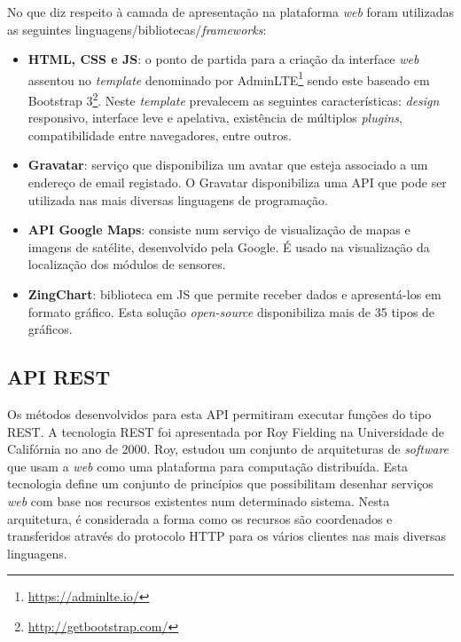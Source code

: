 No que diz respeito à camada de apresentação na plataforma \textit{web} foram utilizadas as seguintes linguagens/bibliotecas/\textit{frameworks}: 

\begin{itemize}
	\item \textbf{\acs{HTML}, \acs{CSS} e \acs{JS}}: o ponto de partida para a criação da interface \textit{web} assentou no \textit{template} denominado por AdminLTE\footnote{\url{https://adminlte.io/}} sendo este baseado em Bootstrap 3\footnote{\url{http://getbootstrap.com/}}. Neste \textit{template} prevalecem as seguintes características:  \textit{design} responsivo, interface leve e apelativa, existência de múltiplos \textit{plugins}, compatibilidade entre navegadores, entre outros. 
	
	\item \textbf{Gravatar}: serviço que disponibiliza um avatar que esteja associado a um endereço de email registado. O Gravatar disponibiliza uma \ac{API} que pode ser utilizada nas mais diversas linguagens de programação\cite{gravatar}.
	 
	\item \textbf{\ac{API} Google Maps}: consiste num serviço de visualização de mapas e imagens de satélite, desenvolvido pela Google. É usado na visualização da localização dos módulos de sensores. 
	
	\item \textbf{ZingChart}: biblioteca em \ac{JS} que permite receber dados e apresentá-los em formato gráfico. Esta solução \textit{open-source} disponibiliza mais de 35 tipos de gráficos. 
\end{itemize}





\subsection{\acs{API} \acs{REST}}


Os métodos desenvolvidos para esta \ac{API} permitiram executar funções do tipo \ac{REST}. A tecnologia \ac{REST} foi apresentada por Roy Fielding na Universidade de Califórnia no ano de 2000\cite{restpaper}. Roy, estudou um conjunto de arquiteturas de \textit{software} que usam a \textit{web} como uma plataforma para computação distribuída\cite{restpaper}. Esta tecnologia define um conjunto de princípios que possibilitam desenhar serviços \textit{web} com base nos recursos existentes num determinado sistema. Nesta arquitetura, é considerada a forma como os recursos são coordenados e transferidos através do protocolo \ac{HTTP} para os vários clientes nas mais diversas linguagens. 

